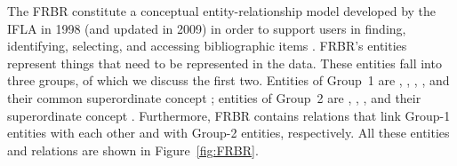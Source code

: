 The \gls{FRBR} constitute a conceptual entity-relationship model
developed by the \gls{IFLA} in 1998 (and updated in 2009)
in order to support users in finding, identifying, selecting, and accessing
bibliographic items \autocite[p.17]{Wiesenmueller2015}.
\gls{FRBR}'s entities represent things that need to be represented in the data.
These entities fall into three groups, of which we discuss the first
two.
Entities of Group~1 are , , , ,
and their common superordinate concept ;
entities of Group~2 are , , ,
and their superordinate concept .
Furthermore, \gls{FRBR} contains relations that link Group-1 entities with each other
and with Group-2 entities, respectively.
All these entities and relations are shown in Figure~\ref{fig:FRBR}.

